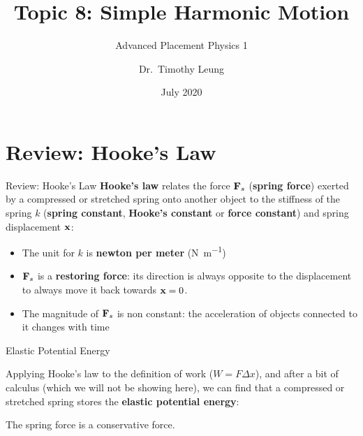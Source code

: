 \documentclass[12pt,compress,aspectratio=169]{beamer}
\title{Topic 8: Simple Harmonic Motion}
\subtitle{Advanced Placement Physics 1}
\author[TML]{Dr.\ Timothy Leung}
\institute{Olympiads School\\Toronto, ON, Canada}
\date{July 2020}
\newcommand{\mb}[1]{\ensuremath\mathbf{#1}}
\newcommand{\eq}[2]{\vspace{#1}{\Large\begin{displaymath}#2\end{displaymath}}}
\begin{document}
\begin{frame}
  \maketitle
\end{frame}


\section{Review: Hooke's Law}

\begin{frame}{Review: Hooke's Law}
  \textbf{Hooke's law} relates the force $\mb{F}_s$ (\textbf{spring force})
  exerted by a compressed or stretched spring onto another object to the
  stiffness of the spring $k$ (\textbf{spring constant}, \textbf{Hooke's
    constant} or \textbf{force constant}) and spring displacement $\mb{x}$:

  \eq{-.1in}{
    \boxed{\mb{F}_s=-k\mb{x}}
  }
  \begin{itemize}
  \item\vspace{-.1in}The unit for $k$ is \textbf{newton per meter}
    (\si{\newton\per\metre})
  \item $\mb{F}_s$ is a \textbf{restoring force}: its direction is always
    opposite to the displacement to always move it back towards $\mb{x}=0$.
  \item The magnitude of $\mb{F}_s$ is non constant: the acceleration of
    objects connected to it changes with time
  \end{itemize}
\end{frame}



\begin{frame}{Elastic Potential Energy}

  Applying Hooke's law to the  definition of work ($W=F\Delta x$), and after a
  bit of calculus (which we will not be showing here), we can find that a
  compressed or stretched spring stores the \textbf{elastic potential energy}:
  
  \eq{-.1in}{
    \boxed{U_e=\frac12kx^2}
  }

  The spring force is a conservative force.
\end{frame}
\end{document}

